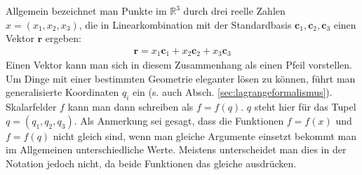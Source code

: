 \documentclass{book}
\begin{document}
Allgemein bezeichnet man Punkte im $\mathbb{R}^3$ durch drei reelle Zahlen $x = \left(x_1, x_2, x_3\right)$, die in Linearkombination mit der Standardbasis $\mathbf{c}_1, \mathbf{c}_2, \mathbf{c}_3$ einen Vektor $\mathbf{r}$ ergeben:
%
\begin{eqnarray}
\mathbf{r} = x_1\mathbf{c}_1 + x_2\mathbf{c}_2 + x_3\mathbf{c}_3
\end{eqnarray}
%
Einen Vektor kann man sich in diesem Zusammenhang als einen Pfeil vorstellen. Um Dinge mit einer bestimmten Geometrie eleganter lösen zu können, führt man generalisierte Koordinaten $q_i$ ein (s. auch Absch. \ref{sec:lagrangeformalismus}). Skalarfelder $f$ kann man dann schreiben als $f = f\left(q\right)$. $q$ steht hier für das Tupel $q = \left(q_1, q_2, q_3\right)$. Als Anmerkung sei gesagt, dass die Funktionen $f = f\left(x\right)$ und $f = f\left(q\right)$ nicht gleich sind, wenn man gleiche Argumente einsetzt bekommt man im Allgemeinen unterschiedliche Werte. Meistens unterscheidet man dies in der Notation jedoch nicht, da beide Funktionen das gleiche ausdrücken.
\end{document}
